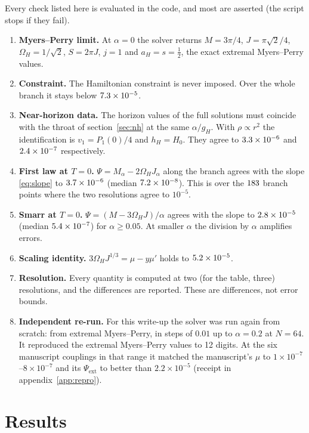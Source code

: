 \documentclass[11pt,a4paper]{article}
\newcommand{\ext}{\mathrm{ext}}
\begin{document}
Every check listed here is evaluated in the code, and most are asserted (the
script stops if they fail).
\begin{enumerate}
\item \textbf{Myers--Perry limit.} At $\alpha=0$ the solver returns
$M=3\pi/4$, $J=\pi\sqrt2/4$, $\Omega_H=1/\sqrt2$, $S=2\pi J$, $j=1$ and
$a_H=s=\tfrac12$, the exact extremal Myers--Perry values.
\item \textbf{Constraint.} The Hamiltonian constraint is never imposed. Over the
whole branch it stays below $7.3\times10^{-5}$.
\item \textbf{Near-horizon data.} The horizon values of the full solutions must
coincide with the throat of section~\ref{sec:nh} at the same $\alpha/g_H$. With
$\rho\propto r^2$ the identification is $v_1=P_1(0)/4$ and $h_H=H_0$. They agree
to $3.3\times10^{-6}$ and $2.4\times10^{-7}$ respectively.
\item \textbf{First law at $T=0$.} $\Psi=M_\alpha-2\Omega_HJ_\alpha$ along the
branch agrees with the slope \eqref{eq:slope} to $3.7\times10^{-6}$ (median
$7.2\times10^{-8}$). This is over the $183$ branch points where the two
resolutions agree to $10^{-5}$.
\item \textbf{Smarr at $T=0$.} $\Psi=(M-3\Omega_HJ)/\alpha$ agrees with the slope
to $2.8\times10^{-5}$ (median $5.4\times10^{-7}$) for $\alpha\ge0.05$. At smaller
$\alpha$ the division by $\alpha$ amplifies errors.
\item \textbf{Scaling identity.} $3\Omega_HJ^{1/3}=\mu-y\mu'$ holds to
$5.2\times10^{-5}$.
\item \textbf{Resolution.} Every quantity is computed at two (for the table, three)
resolutions, and the differences are reported. These are differences, not error
bounds.
\item \textbf{Independent re-run.} For this write-up the solver was run again from
scratch: from extremal Myers--Perry, in steps of $0.01$ up to $\alpha=0.2$ at
$N=64$. It reproduced the extremal Myers--Perry values to 12 digits. At the six
manuscript couplings in that range it matched the manuscript's $\mu$ to
$1\times10^{-7}$--$8\times10^{-7}$ and its $\Psi_\ext$ to better than
$2.2\times10^{-5}$ (receipt in appendix~\ref{app:repro}).
\end{enumerate}

\section{Results}
\label{sec:results}
\end{document}
